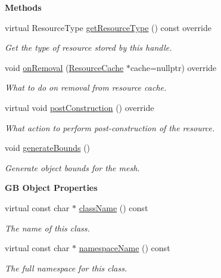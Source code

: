 \begin{Indent}\textbf{ Methods}\par
\begin{DoxyCompactItemize}
\item 
\mbox{\label{classrev_1_1_mesh_a60c101411966a7c260ba2a0df7bff140}} 
virtual Resource\+Type \mbox{\hyperlink{classrev_1_1_mesh_a60c101411966a7c260ba2a0df7bff140}{get\+Resource\+Type}} () const override
\begin{DoxyCompactList}\small\item\em Get the type of resource stored by this handle. \end{DoxyCompactList}\item 
\mbox{\label{classrev_1_1_mesh_a24c34ee9cd39bec2a8a3eb965b620dc8}} 
void \mbox{\hyperlink{classrev_1_1_mesh_a24c34ee9cd39bec2a8a3eb965b620dc8}{on\+Removal}} (\mbox{\hyperlink{classrev_1_1_resource_cache}{Resource\+Cache}} $\ast$cache=nullptr) override
\begin{DoxyCompactList}\small\item\em What to do on removal from resource cache. \end{DoxyCompactList}\item 
virtual void \mbox{\hyperlink{classrev_1_1_mesh_a66d46be8133030a0a02911d9def03f47}{post\+Construction}} () override
\begin{DoxyCompactList}\small\item\em What action to perform post-\/construction of the resource. \end{DoxyCompactList}\item 
\mbox{\label{classrev_1_1_mesh_af865ad5c68dc36fd79a5e077366a7d32}} 
void \mbox{\hyperlink{classrev_1_1_mesh_af865ad5c68dc36fd79a5e077366a7d32}{generate\+Bounds}} ()
\begin{DoxyCompactList}\small\item\em Generate object bounds for the mesh. \end{DoxyCompactList}\end{DoxyCompactItemize}
\end{Indent}
\begin{Indent}\textbf{ GB Object Properties}\par
\begin{DoxyCompactItemize}
\item 
virtual const char $\ast$ \mbox{\hyperlink{classrev_1_1_mesh_a4c3c8a3358e75a1821ab11be746a891c}{class\+Name}} () const
\begin{DoxyCompactList}\small\item\em The name of this class. \end{DoxyCompactList}\item 
virtual const char $\ast$ \mbox{\hyperlink{classrev_1_1_mesh_a38ad31454bc3e4e1d7d4d10b4cf36f83}{namespace\+Name}} () const
\begin{DoxyCompactList}\small\item\em The full namespace for this class. \end{DoxyCompactList}\end{DoxyCompactItemize}
\end{Indent}
